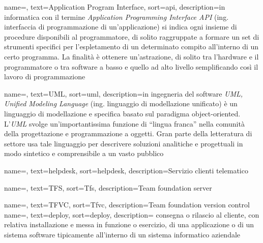 
\renewcommand{\acronymname}{Acronimi e abbreviazioni}






{
    name=,
    text=Application Program Interface,
    sort=api,
    description={in informatica con il termine \emph{Application Programming Interface API} (ing. interfaccia di programmazione di un'applicazione) si indica ogni insieme di procedure disponibili al programmatore, di solito raggruppate a formare un set di strumenti specifici per l'espletamento di un determinato compito all'interno di un certo programma. La finalità è ottenere un'astrazione, di solito tra l'hardware e il programmatore o tra software a basso e quello ad alto livello semplificando così il lavoro di programmazione}
}

{
    name=,
    text=UML,
    sort=uml,
    description={in ingegneria del software \emph{UML, Unified Modeling Language} (ing. linguaggio di modellazione unificato) è un linguaggio di modellazione e specifica basato sul paradigma object-oriented. L'\emph{UML} svolge un'importantissima funzione di ``lingua franca'' nella comunità della progettazione e programmazione a oggetti. Gran parte della letteratura di settore usa tale linguaggio per descrivere soluzioni analitiche e progettuali in modo sintetico e comprensibile a un vasto pubblico}
}

{
    name=,
    text=helpdesk,
    sort=helpdesk,
    description={Servizio clienti telematico}
}

{
    name=,
    text=TFS,
    sort=Tfs,
    description={Team foundation server}
}

{
    name=,
    text=TFVC,
    sort=Tfvc,
    description={Team foundation version control}
}
{
    name=,
    text=deploy,
    sort=deploy,
    description={ consegna o rilascio al cliente, con relativa installazione e messa in funzione o esercizio, di una applicazione o di un sistema software tipicamente all'interno di un sistema informatico aziendale }
}

